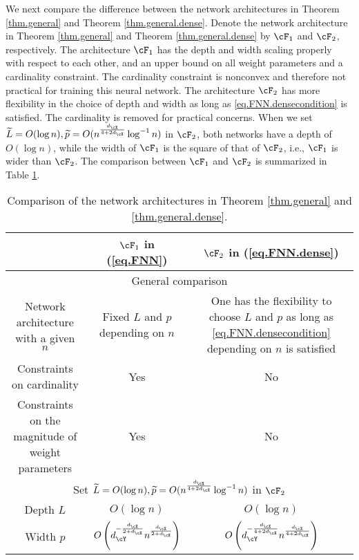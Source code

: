 \documentclass[11pt]{article} %
\begin{document}
We next compare the difference between the network architectures in Theorem \ref{thm.general} and Theorem \ref{thm.general.dense}.
Denote the network architecture in Theorem \ref{thm.general} and Theorem \ref{thm.general.dense} by $\cF_1$ and $\cF_2$, respectively.
The architecture $\cF_1$ has the depth and width scaling properly with respect to each other, and an upper bound on all weight parameters and a cardinality constraint. The cardinality constraint is nonconvex and therefore not practical for training this neural network.
 The architecture $\cF_2$ has more flexibility in the choice of  depth and width as long as  \eqref{eq.FNN.densecondition} is satisfied. The cardinality is removed for practical concerns. When we set $\widetilde{L}=O(\log n), \widetilde{p}=O(n^{\frac{d_{\cX}}{4+2d_{\cX}}}\log^{-1}n)$ in $\cF_2$,  both networks have a depth of $O(\log n)$, while the width of $\cF_1$ is the square of that of $\cF_2$, i.e., $\cF_1$ is wider than $\cF_2$.  The comparison between $\cF_1$ and $\cF_2$ is summarized in Table \ref{tab.NetworkCompare}. 


\begin{table}[ht!]\footnotesize
	\centering
	\begin{tabular}{c||c|c}
		\hline\hline
		& $\cF_1$ in (\ref{eq.FNN}) & $\cF_2$ in (\ref{eq.FNN.dense})\\
		\hline \hline
		\multicolumn{3}{c}{General comparison}\\
		\hline
		\makecell[c]{Network architecture \\ with a given $n$} &Fixed $L$ and $p$ depending on $n$& \makecell[c]{One has the flexibility to choose $L$ and $p$\\ as long as \eqref{eq.FNN.densecondition} depending on $n$ is satisfied }\\
		\hline
		Constraints on cardinality & Yes & No\\
		\hline
		\makecell[c]{Constraints on the\\ magnitude of weight parameters} & Yes & No\\
		\hline \hline
		\multicolumn{3}{c}{Set $\widetilde{L}=O(\log n), \widetilde{p}=O(n^{\frac{d_{\cX}}{4+2d_{\cX}}}\log^{-1}n)$ in $\cF_2$}\\
		\hline \hline
		Depth $L$ & $O(\log n)$ & $O(\log n)$\\
		\hline 
		Width $p$ & $O\left(d_{\cY}^{-\frac{d_{\cX}}{2+d_{\cX}}}n^{\frac{d_{\cX}}{2+d_{\cX}}}\right)$ & $O\left(d_{\cY}^{-\frac{d_{\cX}}{4+2d_{\cX}}}n^{\frac{d_{\cX}}{4+2d_{\cX}}}\right)$\\
		\hline \hline
	\end{tabular}
\caption{\label{tab.NetworkCompare} Comparison of the network architectures in Theorem \ref{thm.general} and \ref{thm.general.dense}.}
\end{table}
\end{document}
